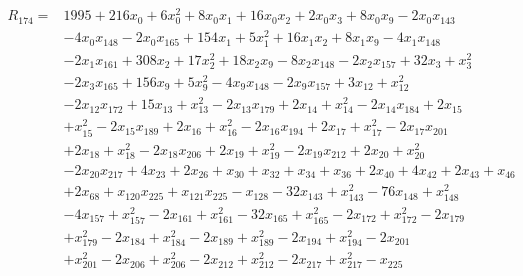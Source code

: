 \[\begin{aligned}R_{174}={}&1995+216x_{0}+6x_{0}^{2}+8x_{0}x_{1}+16x_{0}x_{2}+2x_{0}x_{3}+8x_{0}x_{9}-2x_{0}x_{143}
\\&-4x_{0}x_{148}-2x_{0}x_{165}+154x_{1}+5x_{1}^{2}+16x_{1}x_{2}+8x_{1}x_{9}-4x_{1}x_{148}
\\&-2x_{1}x_{161}+308x_{2}+17x_{2}^{2}+18x_{2}x_{9}-8x_{2}x_{148}-2x_{2}x_{157}+32x_{3}+x_{3}^{2}
\\&-2x_{3}x_{165}+156x_{9}+5x_{9}^{2}-4x_{9}x_{148}-2x_{9}x_{157}+3x_{12}+x_{12}^{2}
\\&-2x_{12}x_{172}+15x_{13}+x_{13}^{2}-2x_{13}x_{179}+2x_{14}+x_{14}^{2}-2x_{14}x_{184}+2x_{15}
\\&+x_{15}^{2}-2x_{15}x_{189}+2x_{16}+x_{16}^{2}-2x_{16}x_{194}+2x_{17}+x_{17}^{2}-2x_{17}x_{201}
\\&+2x_{18}+x_{18}^{2}-2x_{18}x_{206}+2x_{19}+x_{19}^{2}-2x_{19}x_{212}+2x_{20}+x_{20}^{2}
\\&-2x_{20}x_{217}+4x_{23}+2x_{26}+x_{30}+x_{32}+x_{34}+x_{36}+2x_{40}+4x_{42}+2x_{43}+x_{46}
\\&+2x_{68}+x_{120}x_{225}+x_{121}x_{225}-x_{128}-32x_{143}+x_{143}^{2}-76x_{148}+x_{148}^{2}
\\&-4x_{157}+x_{157}^{2}-2x_{161}+x_{161}^{2}-32x_{165}+x_{165}^{2}-2x_{172}+x_{172}^{2}-2x_{179}
\\&+x_{179}^{2}-2x_{184}+x_{184}^{2}-2x_{189}+x_{189}^{2}-2x_{194}+x_{194}^{2}-2x_{201}
\\&+x_{201}^{2}-2x_{206}+x_{206}^{2}-2x_{212}+x_{212}^{2}-2x_{217}+x_{217}^{2}-x_{225}
\end{aligned}\]
\endgroup
